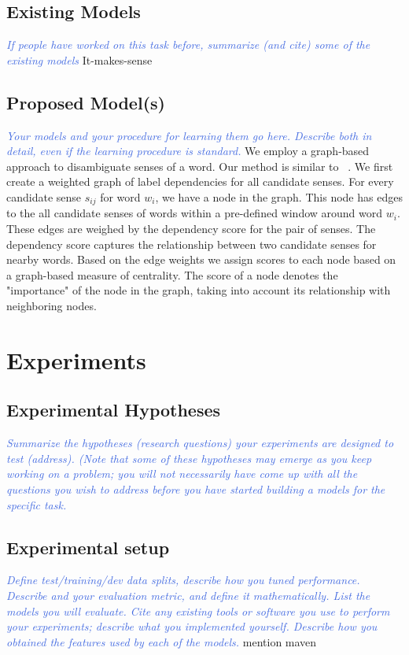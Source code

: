 \documentclass[11pt,letterpaper]{article}
\newcommand{\blue}[1]{\textcolor{RoyalBlue}{#1}}
\newcommand{\instructions}[1]{\blue{\textit{#1}}}
\begin{document}
\subsection{Existing Models}
\label{sec:existing-models}
\instructions{If people have worked on this task before, summarize (and cite) some of the existing models} 
It-makes-sense
\subsection{Proposed Model(s)}
\label{sec:proposed-models}
\instructions{Your models and your procedure for learning them go here. Describe both in detail, even if the learning procedure is standard.}
We employ a graph-based approach to disambiguate senses of a word. Our method is similar to ~\cite{Sinha}. We first create a weighted graph of label dependencies for all candidate senses. For every candidate sense $s_{ij}$ for word $w_i$, we have a node in the graph. This node has edges to the all candidate senses of words within a pre-defined window around word $w_i$. These edges are weighed by the dependency score for the pair of senses. The dependency score captures the relationship between two candidate senses for nearby words. Based on the edge weights we assign scores to each node based on a graph-based measure of centrality. The score of a node denotes the "importance" of the node in the graph, taking into account its relationship with neighboring nodes.

\section{Experiments}
\label{sec:experiments}

\subsection{Experimental Hypotheses}
\label{sec:exper-hypoth}
\instructions{Summarize the hypotheses (research questions) your experiments are designed to test (address). (Note that some of these hypotheses may emerge as you keep working on a problem; you will not necessarily have come up with all the questions you wish to address before you have started building a models for the specific task.}

\subsection{Experimental setup}
\label{sec:experimental-setup}
\instructions{Define test/training/dev data splits, describe how you tuned performance. Describe and your evaluation metric, and define it mathematically.
List the models you will evaluate. Cite any existing tools or software you use to perform your experiments; describe what you implemented yourself. Describe how you obtained the features used by each of the models.}
mention maven
\end{document}
